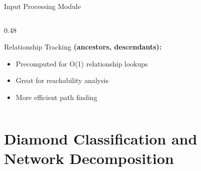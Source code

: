 \documentclass[aspectratio=169]{beamer}
\begin{document}
\begin{frame}{\textcolor{juliagreen}{Input Processing Module }}
\begin{columns}
\begin{column}{0.48\textwidth}
\begin{block}{\textcolor{juliagreen}{Relationship Tracking}}
\small
\textbf{(ancestors, descendants):}
\begin{itemize}
\item Precomputed for O(1) relationship lookups
\item Great for reachability analysis
\item More efficient path finding
\end{itemize}
\end{block}
\end{column}
\end{columns}


\end{frame}

\section{Diamond Classification and Network Decomposition}
\end{document}
